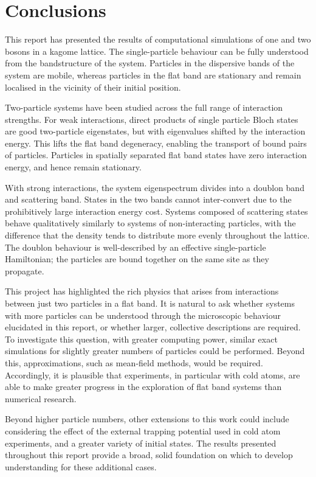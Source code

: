\chapter{Conclusions}\label{Sec:Conclusions}

This report has presented the results of computational simulations of one and two bosons in a kagome lattice. The single-particle behaviour can be fully understood from the bandstructure of the system. Particles in the dispersive bands of the system are mobile, whereas particles in the flat band are stationary and remain localised in the vicinity of their initial position.

Two-particle systems have been studied across the full range of interaction strengths. For weak interactions, direct products of single particle Bloch states are good two-particle eigenstates, but with eigenvalues shifted by the interaction energy. This lifts the flat band degeneracy, enabling the transport of bound pairs of particles. Particles in spatially separated flat band states have zero interaction energy, and hence remain stationary.

With strong interactions, the system eigenspectrum divides into a doublon band and scattering band. States in the two bands cannot inter-convert due to the prohibitively large interaction energy cost. Systems composed of scattering states behave qualitatively similarly to systems of non-interacting particles, with the difference that the density tends to distribute more evenly throughout the lattice. The doublon behaviour is well-described by an effective single-particle Hamiltonian; the particles are bound together on the same site as they propagate.

This project has highlighted the rich physics that arises from interactions between just two particles in a flat band. It is natural to ask whether systems with more particles can be understood through the microscopic behaviour elucidated in this report, or whether larger, collective descriptions are required. To investigate this question, with greater computing power, similar exact simulations for slightly greater numbers of particles could be performed. Beyond this, approximations, such as mean-field methods, would be required. Accordingly, it is plausible that experiments, in particular with cold atoms, are able to make greater progress in the exploration of flat band systems than numerical research.

Beyond higher particle numbers, other extensions to this work could include considering the effect of the external trapping potential used in cold atom experiments, and a greater variety of initial states. The results presented throughout this report provide a broad, solid foundation on which to develop understanding for these additional cases.